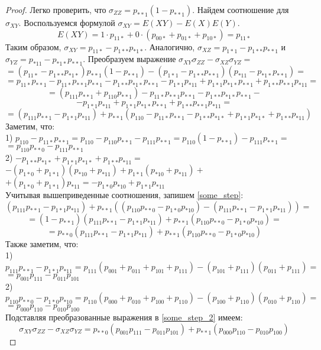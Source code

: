 \begin{proof}
    Легко проверить, что $\sigma_{ZZ}= p_{**1}(1-p_{**1})$. Найдем соотношение для $\sigma_{XY}$. Воспользуемся формулой $\sigma_{XY}=E(X Y)-E(X)E(Y)$.
    $$E(X Y) = 1 \cdot p_{11*} + 0 \cdot (p_{00*} + p_{01*} + p_{10*})=p_{11*}$$
    Таким образом, $\sigma_{XY}=p_{11*}-p_{1**}p_{*1*}$. Аналогично, $\sigma_{XZ}=p_{1*1}-p_{1**}p_{**1}$ и $\sigma_{YZ}=p_{*11}-p_{*1*}p_{**1}$.
    Преобразуем выражение $\sigma_{XY} \sigma_{ZZ} - \sigma_{XZ} \sigma_{YZ} =$
    $$
        = (p_{11*}-p_{1**}p_{*1*}) p_{**1}(1-p_{**1})
        -(p_{1*1}-p_{1**}p_{**1})(p_{*11}-p_{*1*}p_{**1})=
    $$
    $$
        = p_{11*}p_{**1} - p_{11*}p_{**1}p_{**1} - p_{1**}p_{*1*}p_{**1} 
        -p_{1*1}p_{*11}+p_{1*1}p_{*1*}p_{**1}+p_{1**}p_{**1}p_{*11} =
    $$
    $$
        =(p_{111}p_{**1}+p_{110}p_{**1}) - p_{11*}p_{**1}p_{**1} - p_{1**}p_{*1*}p_{**1} -
    $$ $$
        -p_{1*1}p_{*11}+p_{1*1}p_{*1*}p_{**1}+p_{1**}p_{**1}p_{*11}=
    $$
    \begin{equation}\label{some_step}
        =(p_{111}p_{**1}-p_{1*1}p_{*11})+p_{**1}(p_{110}-p_{11*}p_{**1} - p_{1**}p_{*1*} + p_{1*1}p_{*1*} + p_{1**}p_{*11})
    \end{equation}
    Заметим, что:\\
    1) $
        p_{110}-p_{11*}p_{**1}=p_{110}-p_{110}p_{**1}-p_{111}p_{**1}=
        p_{110}(1-p_{**1})-p_{111}p_{**1}=
    $
    $ 
        =p_{110}p_{**0}-p_{111}p_{**1}
    $\\
    2) $
        -p_{1**}p_{*1*} + p_{1*1}p_{*1*} + p_{1**}p_{*11}=
    $
    $
        -(p_{1*0}+p_{1*1})(p_{*10}+p_{*11})+p_{1*1}(p_{*10}+p_{*11}) + $
        $+(p_{1*0}+p_{1*1})p_{*11}=
        -p_{1*0}p_{*10}+p_{1*1}p_{*11}
    $\\
    Учитывая вышеприведенные соотношения, запишем \eqref{some_step}:
    $$
    (p_{111}p_{**1}-p_{1*1}p_{*11})+p_{**1}((p_{110}p_{**0}-p_{1*0}p_{*10})-(p_{111}p_{**1}-p_{1*1}p_{*11}))=
    $$
    $$
        =(1-p_{**1})(p_{111}p_{**1}-p_{1*1}p_{*11})+p_{**1}(p_{110}p_{**0}-p_{1*0}p_{*10})=
    $$
    \begin{equation}\label{some_step_2}
        =p_{**0}(p_{111}p_{**1}-p_{1*1}p_{*11})+p_{**1}(p_{110}p_{**0}-p_{1*0}p_{*10})
    \end{equation}
    Также заметим, что:\\
    1) $
        p_{111}p_{**1}-p_{1*1}p_{*11} = p_{111}(p_{001}+p_{011}+p_{101}+p_{111})-
        (p_{101}+p_{111})(p_{011}+p_{111})=
    $
    $
        = p_{001}p_{111}-p_{011}p_{101}
    $
    \\
    2) $
        p_{110}p_{**0}-p_{1*0}p_{*10}=
        p_{110}(p_{000}+p_{010}+p_{100}+p_{110})-(p_{100}+p_{110})(p_{010}+p_{110})=
    $
    $
        =p_{000}p_{110}-p_{010}p_{100}
    $\\
    Подставляя преобразованные выражения в \eqref{some_step_2} имеем:
    $$
    \sigma_{XY} \sigma_{ZZ} - \sigma_{XZ} \sigma_{YZ} = p_{**0}(p_{001}p_{111}-p_{011}p_{101}) + p_{**1} (p_{000}p_{110}-p_{010}p_{100})
    $$
\end{proof}
